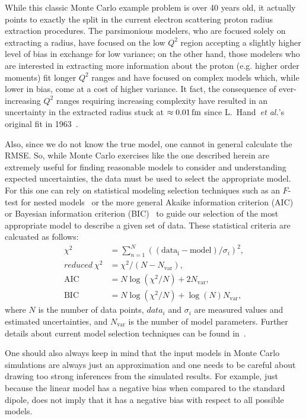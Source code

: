 \documentclass[10pt,aps,prc,twocolumn]{revtex4-1}
\begin{document}
While this classic Monte Carlo example problem is over 40 years old, it actually points to exactly the split in 
the current electron scattering proton radius extraction procedures.     The parsimonious modelers, who are 
focused solely on extracting a radius, have focused on the low $Q^2$ region accepting a slightly higher 
level of bias in exchange for low variance; on the other hand, those modelers who are interested in extracting more information 
about the proton (e.g. higher order moments) fit longer $Q^2$ ranges and have
focused on complex models which, while lower in bias, come at a cost of higher variance.  
It fact, the consequence of ever-increasing $Q^2$ ranges requiring increasing complexity have resulted in
an uncertainty in the extracted radius 
stuck at $\approx \unit[0.01]{fm}$ since L.~Hand~\textit{et al.}'s original fit in 1963~\cite{Hand:1963zz}.

Also, since we do not know the true model, one cannot in general calculate the RMSE. So, while Monte Carlo exercises 
like the one described herein are extremely useful for finding reasonable models to consider and understanding
expected uncertainties, the data must be used to select the appropriate model. 
For this one can rely on statistical modeling selection techniques such as an $F$-test for
nested models~\cite{Bevington:2003,James:2006,Sirca:2016} or the more general Akaike information criterion (AIC)~\cite{Akaike:1974} 
or Bayesian information criterion (BIC)~\cite{Schwarz:1978} 
to guide our selection of the most appropriate model to describe a given set of data.
These statistical criteria are calcuated as follows: 
\begin{align}
\chi^2         & = \sum_{n=1}^{N}((\mathrm{data_i} - \mathrm{model}) / \sigma_i)^2, \\
reduced~\chi^2 & = \chi^2/ (N - N_{\mathrm{var}}),  \\
\mathrm{AIC}            & = N \log(\chi^2/N) + 2 N_{\mathrm{var}}, \\
\mathrm{BIC}            & = N \log(\chi^2/N) + \log(N) N_{\mathrm{var}},
\end{align}
where $N$ is the number of data points, $data_i$ and $\sigma_i$ are measured values and estimated uncertainties,
and $N_{\mathrm{var}}$ is the number of model parameters.
Further details about current model selection techniques can be found in~\cite{Ernst:2012}.

One should also always keep in mind that the input models in Monte Carlo simulations are always just an approximation
and one needs to be careful about drawing too strong inferences from the simulated results. 
For example, just because the linear model has a negative bias when compared to the standard dipole, 
does not imply that it has a negative bias with respect to all possible models.
\end{document}
